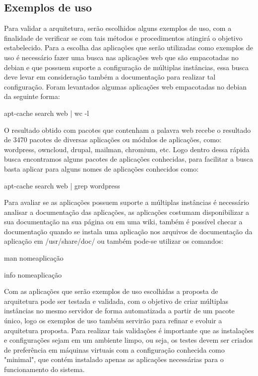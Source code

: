\subsection{Exemplos de uso}

Para validar a arquitetura, serão escolhidos alguns exemplos de uso, com a
finalidade de verificar se com tais métodos e procedimentos atingirá o objetivo
estabelecido. Para a escolha das aplicações que serão utilizadas como exemplos
de uso é necessário fazer uma busca nas aplicações web que são empacotadas no
debian e que possuem suporte a configuração de múltiplas instâncias, essa busca
deve levar em consideração também a documentação para realizar tal configuração.
Foram levantados algumas aplicações web empacotadas no debian da seguinte forma:

\begin{center}
apt-cache search web | wc -l
\end{center}

O resultado obtido com pacotes que contenham a palavra web recebe o resultado de 3470
pacotes de diversas aplicações ou módulos de aplicações, como:
wordpress, owncloud, drupal, mailman, chromium, etc. Logo dentro dessa rápida busca
encontramos alguns pacotes de aplicações conhecidas, para facilitar a busca basta
aplicar para alguns nomes de aplicações conhecidos como:

\begin{center}
apt-cache search web | grep wordpress
\end{center}

Para avaliar se as aplicações possuem suporte a múltiplas instâncias é necessário
analisar a documentação das aplicações, as aplicações costumam disponibilizar a sua
documentação na sua página ou em uma wiki, também é possível checar a documentação
quando se instala uma aplicação nos arquivos de documentação da aplicação em
/usr/share/doc/ ou também pode-se utilizar os comandos:

\begin{center}
man nomeaplicação

info nomeaplicação
\end{center}

Com as aplicações que serão exemplos de uso escolhidas a proposta de arquitetura
pode ser testada e validada, com o objetivo de criar múltiplas instâncias
no mesmo servidor de forma automatizada a partir de um pacote único, logo os
exemplos de uso também servirão para refinar e evoluir a arquitetura proposta.
Para realizar tais validações é importante que as instalações e configurações
sejam em um ambiente limpo, ou seja, os testes devem ser criados de preferência
em máquinas virtuais com a configuração conhecida como "minimal", que contém
instalado apenas as aplicações necessárias para o funcionamento do sistema.
